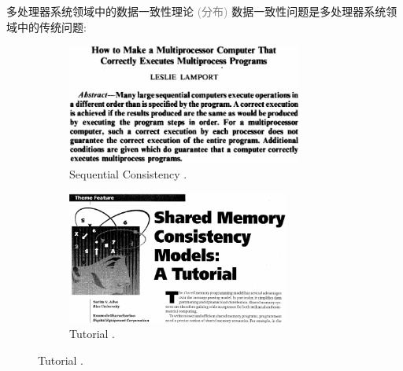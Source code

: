 \begin{frame}{多处理器系统领域中的数据一致性理论}
  \textcolor{gray}{\small (分布)} 数据一致性问题是多处理器系统领域中的传统问题:
  \vspace{0.50cm}

  \begin{figure}
	\begin{subfigure}{0.50\textwidth}
	  \centering
	  \includegraphics[width = 0.85\textwidth]{figures/lamport-paper79.png}
	  \caption{Sequential Consistency .}
	\end{subfigure}%
	\begin{subfigure}{0.45\textwidth}
	  \centering
	  \includegraphics[width = 0.80\textwidth]{figures/ieee-computer-tutorial.png}
	  \caption{Tutorial .}
	\end{subfigure}
  \end{figure}
\end{frame}
